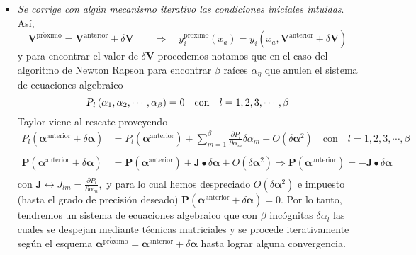 \documentclass[spanish,titlepage,11pt]{article}
\begin{document}
\begin{itemize}
\item \textit{Se corrige con alg\'{u}n mecanismo iterativo las condiciones
iniciales intuidas}. As\'{i},
\[
\mathbf{V}^{\mathrm{pr\acute{o}ximo}}=\mathbf{V}^{\mathrm{anterior}}%
+\delta\mathbf{V\qquad\Rightarrow\quad}y_{i}^{\mathrm{pr\acute{o}ximo}}%
(x_{a})=y_{i}\left(  x_{a},\mathbf{V}^{\mathrm{anterior}}+\delta
\mathbf{V}\right)
\]
y para encontrar el valor de $\delta\mathbf{V}$ procedemos notamos que en el
caso del algoritmo de Newton Rapson para encontrar $\beta$ ra\'{i}ces
$\alpha_{\eta}$ que anulen el sistema de ecuaciones algebraico
\[
\textsl{P}_{l}\left(  \alpha_{1},\alpha_{2},\cdots,\alpha_{\beta}\right)
=0\quad\mathrm{con\quad}l=1,2,3,\cdots,\beta
\]
Taylor viene al rescate proveyendo
\begin{align*}
P_{l}\left(  \mathbf{\alpha}^{\mathrm{anterior}}+\delta\mathbf{\alpha
}\right)   &  =P_{l}\left(  \mathbf{\alpha}^{\mathrm{anterior}}\right)
+\sum_{m=1}^{\beta}\frac{\partial P_{l}}{\partial\alpha_{m}}\delta\alpha
_{m}+O\left(  \delta\mathbf{\alpha}^{2}\right)  \quad\mathrm{con\quad
}l=1,2,3,\cdots,\beta\\
& \\
\mathbf{P}\left(  \mathbf{\alpha}^{\mathrm{anterior}}+\delta\mathbf{\alpha
}\right)   &  =\mathbf{P}\left(  \mathbf{\alpha}^{\mathrm{anterior}}\right)
+\mathbf{J\bullet}\delta\mathbf{\alpha}+O\left(  \delta\mathbf{\alpha}%
^{2}\right)  \Rightarrow\mathbf{P}\left(  \mathbf{\alpha}^{\mathrm{anterior}%
}\right)  =-\mathbf{J\bullet}\delta\mathbf{\alpha}\\
&
\end{align*}
con $\mathbf{J}\longleftrightarrow J_{lm}=\frac{\partial P_{l}}{\partial
\alpha_{m}},$ y para lo cual hemos despreciado $O\left(  \delta\mathbf{\alpha
}^{2}\right)  $ e impuesto (hasta el grado de precisi\'{o}n deseado)
$\mathbf{P}\left(  \mathbf{\alpha}^{\mathrm{anterior}}+\delta\mathbf{\alpha
}\right)  =0$. Por lo tanto, tendremos un sistema de ecuaciones algebraico que
con $\beta$ inc\'{o}gnitas $\delta\alpha_{l}$ las cuales se despejan mediante
t\'{e}cnicas matriciales y se procede iterativamente seg\'{u}n el esquema
$\mathbf{\alpha}^{\mathrm{pr\acute{o}ximo}}=\mathbf{\alpha}^{\mathrm{anterior}%
}+\delta\mathbf{\alpha}$ hasta lograr alguna convergencia.


\end{itemize}
\end{document}

